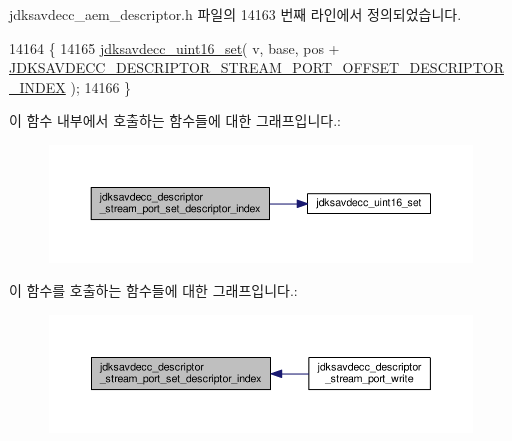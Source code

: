 jdksavdecc\+\_\+aem\+\_\+descriptor.\+h 파일의 14163 번째 라인에서 정의되었습니다.


\begin{DoxyCode}
14164 \{
14165     \hyperlink{group__endian_ga14b9eeadc05f94334096c127c955a60b}{jdksavdecc\_uint16\_set}( v, base, pos + 
      \hyperlink{group__descriptor__stream__port_gaf70639e574f693c20b7635c300612a5d}{JDKSAVDECC\_DESCRIPTOR\_STREAM\_PORT\_OFFSET\_DESCRIPTOR\_INDEX}
       );
14166 \}
\end{DoxyCode}


이 함수 내부에서 호출하는 함수들에 대한 그래프입니다.\+:
\nopagebreak
\begin{figure}[H]
\begin{center}
\leavevmode
\includegraphics[width=350pt]{group__descriptor__stream__port_gaea8ba85a6935bce53a5ff07e80b791df_cgraph}
\end{center}
\end{figure}




이 함수를 호출하는 함수들에 대한 그래프입니다.\+:
\nopagebreak
\begin{figure}[H]
\begin{center}
\leavevmode
\includegraphics[width=350pt]{group__descriptor__stream__port_gaea8ba85a6935bce53a5ff07e80b791df_icgraph}
\end{center}
\end{figure}



